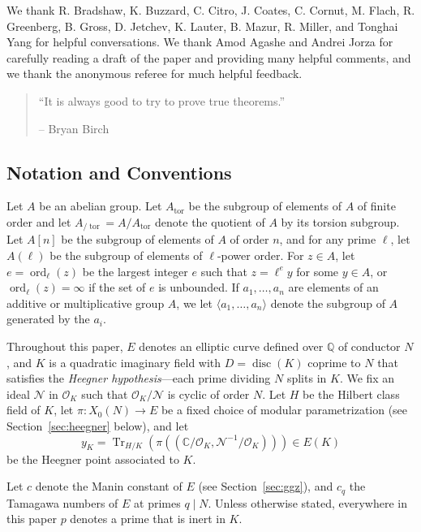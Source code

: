 \documentclass{oupau}
\DeclareMathOperator{\disc}{disc}
\DeclareMathOperator{\ord}{ord}
\DeclareMathOperator{\Tr}{Tr}
\DeclareMathOperator{\tor}{tor}
\newcommand{\CC}{\mathbb{C}}
\newcommand{\OO}{\mathcal{O}}
\newcommand{\QQ}{\mathbb{Q}}
\begin{document}
\vspace{2ex}
 We thank R. Bradshaw, K.
Buzzard, C. Citro, J. Coates, C. Cornut, M. Flach, R. Greenberg,
B. Gross, D. Jetchev, K. Lauter, B. Mazur, R. Miller, and 
Tonghai Yang for helpful conversations.  We thank Amod
Agashe and Andrei Jorza for carefully reading a draft of the paper
and providing many helpful comments, and we thank the anonymous
referee for much helpful feedback.

\begin{quote}
``It is always good to try to prove true theorems.''

-- Bryan Birch
\end{quote}



\subsection{Notation and Conventions}\label{notation}
Let $A$ be an abelian group.  Let $A_{\tor}$ be the subgroup of
elements of $A$ of finite order and let $A_{/\tor} = A/A_{\tor}$ denote the
quotient of $A$ by its torsion subgroup.  Let $A[n]$ be the
subgroup of elements of $A$ of order $n$, and for any prime $\ell$,
let $A(\ell)$ be the subgroup of elements of $\ell$-power order.  For
$z\in A$, let $e=\ord_{\ell}(z)$ be the largest integer $e$ such that $z
= \ell^e y$ for some $y \in A$, or $\ord_{\ell}(z)=\infty$ if the set
of $e$ is unbounded.
If $a_1,\ldots, a_n$ are elements of an additive or multiplicative
group $A$, we let $\langle a_1, \ldots , a_n\rangle$ 
denote the subgroup of $A$ generated by the $a_i$.

Throughout this paper, $E$ denotes an elliptic curve defined over
$\QQ$ of conductor $N$, and $K$ is a quadratic imaginary field with
$D=\disc(K)$ coprime to $N$ that satisfies the {\em Heegner
  hypothesis}---each prime dividing $N$ splits in $K$.  We fix an
ideal $\mathcal{N}$ in $\OO_K$ such that $\OO_K/\mathcal{N}$ is cyclic
of order $N$.  Let $H$ be the Hilbert class field of $K$,
let $\pi:X_0(N)\to E$ be a fixed choice of modular 
parametrization (see Section~\ref{sec:heegner} below),
and let 
\begin{equation}\label{eqn:yK}
  y_K = \Tr_{H/K}(\pi((\CC/\OO_K,\mathcal{N}^{-1}/\OO_K))) \in E(K)
\end{equation}
be the Heegner point associated to $K$.

Let $c$ denote the Manin constant of $E$ (see
Section~\ref{sec:ggz}), and $c_q$ the Tamagawa numbers of $E$ at
primes $q\mid N$.  Unless otherwise stated, everywhere in this paper
$p$ denotes a prime that is inert in $K$.
\end{document}
